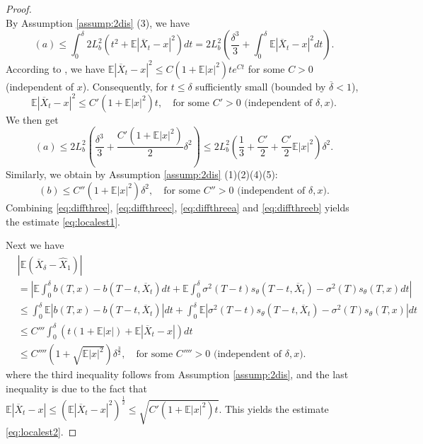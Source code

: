 \documentclass[letterpaper,11pt,reqno]{amsart}
\numberwithin{equation}{section}
\begin{document}
\begin{proof}
\begin{equation}
\end{equation}
By Assumption \ref{assump:2dis} (3), we have
\begin{equation*}
(a) \le \int_0^\delta 2 L_b^2 (t^2 + \mathbb{E}|\overline{X}_t - x|^2) dt
= 2L_b^2 \left(\frac{\delta^3}{3} + \int_0^\delta \mathbb{E}|\overline{X}_t - x|^2 dt \right).
\end{equation*}
According to \cite[Theorem 4.5.4]{KP92},
we have $\mathbb{E}|\overline{X}_t - x|^2 \le C(1 + \mathbb{E}|x|^2)t e^{Ct}$ 
for some $C>0$ (independent of $x$).
Consequently, for $t \le \delta$ sufficiently small (bounded by $\overline{\delta} < 1$),
\begin{equation*}
\mathbb{E}|\overline{X}_t - x|^2 \le C'(1 + \mathbb{E}|x|^2) t, \quad \mbox{for some } C' > 0 \mbox{ (independent of } \delta, x).
\end{equation*}
We then get
\begin{equation}
\label{eq:diffthreea}
(a) \le 2 L_b^2 \left(\frac{\delta^3}{3} + \frac{C'(1 + \mathbb{E}|x|^2)}{2} \delta^2  \right) \le 2 L_b^2 \left(\frac{1}{3} + \frac{C'}{2} + \frac{C'}{2} \mathbb{E}|x|^2 \right) \delta^2.
\end{equation}
Similarly, we obtain by Assumption \ref{assump:2dis} (1)(2)(4)(5):
\begin{equation}
\label{eq:diffthreeb}
(b) \le C'' (1 + \mathbb{E}|x|^2) \delta^2, \quad \mbox{for some } C''>0 \mbox{ (independent of } \delta, x).
\end{equation}
Combining \eqref{eq:diffthree}, \eqref{eq:diffthreec},
\eqref{eq:diffthreea} and \eqref{eq:diffthreeb} yields
the estimate \eqref{eq:localest1}.

\quad Next we have
\begin{align*}
& |\mathbb{E}(\overline{X}_\delta - \widehat{X}_1)|  \\
& = \left|\mathbb{E}\int_0^\delta b(T,x) - b(T-t,\overline{X}_t) dt
+ \mathbb{E}\int_0^\delta \sigma^2(T-t) s_\theta(T-t, \overline{X}_t) - \sigma^2(T)s_\theta(T,x) dt \right| \\
& \le \int_0^\delta \mathbb{E}|b(T,x) - b(T-t,\overline{X}_t)| dt
+ \int_0^\delta \mathbb{E}|\sigma^2(T-t) s_\theta(T-t, \overline{X}_t) - \sigma^2(T)s_\theta(T,x)| dt \\
& \le C''' \int_0^\delta  \left(t (1 + \mathbb{E}|x|) + \mathbb{E}|\overline{X}_t - x| \right) dt \\
& \le C''''(1 + \sqrt{\mathbb{E}|x|^2}) \delta^{\frac{3}{2}},
\quad \mbox{for some } C''''>0 \mbox{ (independent of } \delta, x).
\end{align*}
where the third inequality follows from Assumption \ref{assump:2dis}, and the last inequality is due to the fact that
$\mathbb{E}|\overline{X}_t - x| \le \left(\mathbb{E}|\overline{X}_t - x|^2\right)^{\frac{1}{2}} \le \sqrt{C'(1 + \mathbb{E}|x|^2)t}$.
This yields the estimate \eqref{eq:localest2}.
\end{proof}
\end{document}
